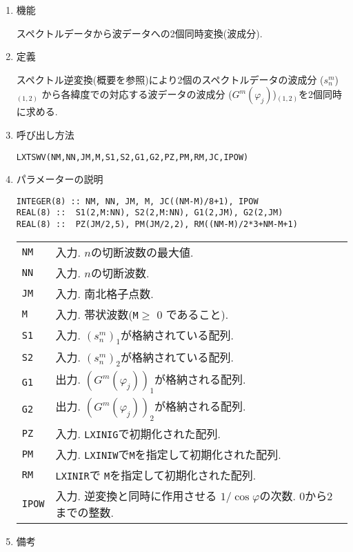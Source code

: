\documentclass[a4j]{jarticle}
\begin{document}
\begin{enumerate}

\item 機能 

スペクトルデータから波データへの2個同時変換(波成分).

\item 定義

スペクトル逆変換(概要を参照)により2個のスペクトルデータの波成分
($s^m_n$)$_{(1,2)}$
から各緯度での対応する波データの波成分
($G^m(\varphi_j)$)$_{(1,2)}$を2個同時に求める.

\item 呼び出し方法 

\texttt{LXTSWV(NM,NN,JM,M,S1,S2,G1,G2,PZ,PM,RM,JC,IPOW)}
  
\item パラメーターの説明

\begin{verbatim}  
INTEGER(8) :: NM, NN, JM, M, JC((NM-M)/8+1), IPOW
REAL(8) ::  S1(2,M:NN), S2(2,M:NN), G1(2,JM), G2(2,JM)
REAL(8) ::  PZ(JM/2,5), PM(JM/2,2), RM((NM-M)/2*3+NM-M+1)
\end{verbatim}  

\begin{tabular}{ll}
\texttt{NM} & 入力. $n$の切断波数の最大値.\\
\texttt{NN} & 入力. $n$の切断波数.\\
\texttt{JM} & 入力. 南北格子点数.\\
\texttt{M} & 入力. 帯状波数(\texttt{M}$\ge$ 0 であること).\\
\texttt{S1} & 入力. $(s^m_n)_1$が格納されている配列.\\
\texttt{S2} & 入力. $(s^m_n)_2$が格納されている配列.\\
\texttt{G1} & 出力. $(G^m(\varphi_j))_1$が格納される配列.\\
\texttt{G2} & 出力. $(G^m(\varphi_j))_2$が格納される配列.\\
\texttt{PZ}  & 入力. \texttt{LXINIG}で初期化された配列.\\
\texttt{PM}  & 入力. \texttt{LXINIW}で\texttt{M}を指定して初期化された配列.\\
\texttt{RM}  & \texttt{LXINIR}で \texttt{M}を指定して初期化された配列.\\
\texttt{IPOW} & 入力. 逆変換と同時に作用させる
                      $1/\cos\varphi$の次数. 0から2までの整数.
\end{tabular}

\item 備考


\end{enumerate}
\end{document}
